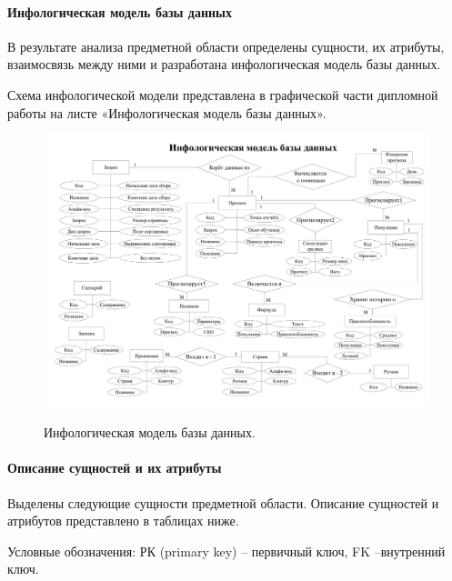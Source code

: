 \paragraph{Инфологическая модель базы данных} \hfill

В результате анализа предметной области определены сущности, их атрибуты, взаимосвязь между ними и разработана инфологическая модель базы данных.

Схема инфологической модели представлена в графической части дипломной работы на листе «Инфологическая модель базы данных».

\begin{figure}[!h]
\centering
\includegraphics[width=\textwidth]{design/ramkaless/3.png}
\label{figure:infologModel}
\caption{Инфологическая модель базы данных.}
\end{figure}

\paragraph{Описание сущностей и их атрибуты} \hfill

Выделены следующие сущности предметной области. Описание сущностей и атрибутов представлено в таблицах ниже.

Условные обозначения: РК (primary key) – первичный ключ, FK –внутренний ключ.

